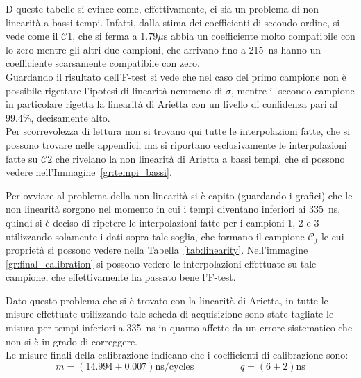 D queste tabelle si evince come, effettivamente, ci sia un problema di non linearità a bassi tempi. Infatti, dalla stima dei coefficienti di secondo ordine, si vede come il $\mathcal{C}1$, che si ferma a $1.79 \mu\text{s}$ abbia un coefficiente molto compatibile con lo zero mentre gli altri due campioni, che arrivano fino a 215~ns hanno un coefficiente scarsamente compatibile con zero.\\

Guardando il risultato dell'F-test si vede che nel caso del primo campione non è possibile rigettare l'ipotesi di linearità nemmeno di $\sigma$, mentre il secondo campione in particolare rigetta la linearità di Arietta con un livello di confidenza pari al 99.4\%, decisamente alto.\\


Per scorrevolezza di lettura non si trovano qui tutte le interpolazioni fatte, che si possono trovare nelle appendici, ma si riportano esclusivamente le interpolazioni fatte su $\mathcal{C}2$  che rivelano la non linearità di Arietta a bassi tempi, che si possono vedere nell'Immagine~\ref{gr:tempi_bassi}.\\

Per ovviare al problema della non linearità si è capito (guardando i grafici) che le non linearità sorgono nel momento in cui i tempi diventano inferiori ai 335~ns, quindi si è deciso di ripetere le interpolazioni fatte per i campioni 1, 2 e 3 utilizzando solamente i dati sopra tale soglia, che formano il campione $\mathcal{C}_f$ le cui proprietà si possono vedere nella Tabella~\ref{tab:linearity}. Nell'immagine \ref{gr:final_calibration} si possono vedere le interpolazioni effettuate su tale campione, che effettivamente ha passato bene l'F-test.\\

Dato questo problema che si è trovato con la linearità di Arietta, in tutte le misure effettuate utilizzando tale scheda di acquisizione sono state tagliate le misura per tempi inferiori a 335~ns in quanto affette da un errore sistematico che non si è in grado di correggere.\\

Le misure finali della calibrazione indicano che i coefficienti  di calibrazione sono:
\begin{equation}
  m = (14.994 \pm 0.007) \text{ns/cycles} \hspace{2cm} q = (6 \pm 2) \text{ns}
\end{equation}


